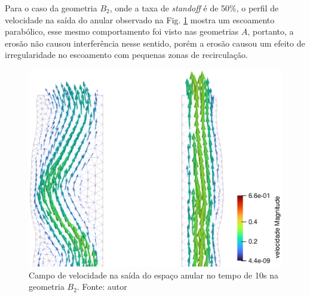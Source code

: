    
Para o caso da geometria $B_2$, onde a taxa de \textit{standoff} é de 50\%, o perfil de velocidade na saída do anular observado na Fig. \ref{fig:perfil_velocidade_rugoso_saida_paraview_10s} mostra um escoamento parabólico, esse mesmo comportamento foi visto nas geometrias $A$, portanto, a erosão não causou interferência nesse sentido, porém a erosão causou um efeito de irregularidade no escoamento com pequenas zonas de recirculação.
    
\begin{figure}[H]
        \centering
    	\includegraphics[scale=0.5]{img/perfil_vel/rugoso/perfil_de_vel_saida_standoff_paraview.eps}
    	\caption{Campo de velocidade na saída do espaço anular no tempo de 10s na geometria $B_2$. Fonte: autor}
    	\label{fig:perfil_velocidade_rugoso_saida_paraview_10s}
\end{figure}
    
